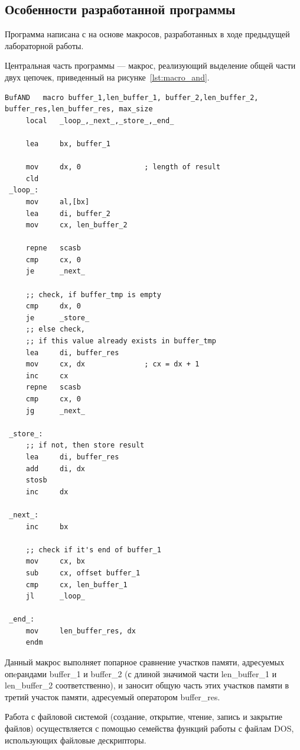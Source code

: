 \subsection{Особенности разработанной программы}

Программа написана с на основе макросов, разработанных в ходе
предыдущей лабораторной работы.

Центральная часть программы --- макрос, реализующий выделение
общей части двух цепочек, приведенный на рисунке~\ref{lst:macro_and}.

\begin{lstlisting}[caption=Макрос выделения общих значений двух цепочек,
label=lst:macro_and,language={[x86masm]Assembler},basicstyle=\scriptsize\ttfamily]
 BufAND   macro buffer_1,len_buffer_1, buffer_2,len_buffer_2, buffer_res,len_buffer_res, max_size
     local   _loop_,_next_,_store_,_end_       
 
     lea     bx, buffer_1
 
     mov     dx, 0               ; length of result
     cld
 _loop_:
     mov     al,[bx]
     lea     di, buffer_2
     mov     cx, len_buffer_2
     
     repne   scasb
     cmp     cx, 0    
     je      _next_
 
     ;; check, if buffer_tmp is empty
     cmp     dx, 0
     je      _store_
     ;; else check,
     ;; if this value already exists in buffer_tmp 
     lea     di, buffer_res
     mov     cx, dx              ; cx = dx + 1
     inc     cx
     repne   scasb
     cmp     cx, 0
     jg      _next_
 
 _store_:
     ;; if not, then store result        
     lea     di, buffer_res
     add     di, dx
     stosb
     inc     dx
 
 _next_: 
     inc     bx        
 
     ;; check if it's end of buffer_1
     mov     cx, bx
     sub     cx, offset buffer_1
     cmp     cx, len_buffer_1
     jl      _loop_
         
 _end_:
     mov     len_buffer_res, dx
     endm
\end{lstlisting}

Данный макрос выполняет попарное сравнение участков памяти, адресуемых опeрандами
buffer\_1 и buffer\_2 (с длиной значимой части len\_buffer\_1 и len\_buffer\_2 соответственно),
и заносит общую часть этих участков памяти в третий участок памяти,
адресуемый оператором buffer\_res.

Работа с файловой системой (создание, открытие, чтение, запись и закрытие файлов) осуществляется
с помощью семейства функций работы с файлам DOS, использующих файловые дескрипторы.

